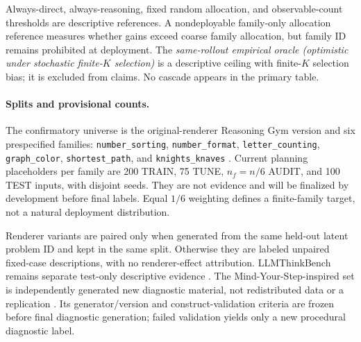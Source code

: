 \documentclass{article}
\newcommand{\1}{\mathbb{I}}
\begin{document}
Always-direct, always-reasoning, fixed random allocation, and observable-count thresholds are descriptive references. A nondeployable family-only allocation reference measures whether gains exceed coarse family allocation, but family ID remains prohibited at deployment. The \emph{same-rollout empirical oracle (optimistic under stochastic finite-$K$ selection)} is a descriptive ceiling with finite-$K$ selection bias; it is excluded from claims. No cascade appears in the primary table.

\paragraph{Splits and provisional counts.}
The confirmatory universe is the original-renderer Reasoning Gym version and six prespecified families: \texttt{number\_sorting}, \texttt{number\_format}, \texttt{letter\_counting}, \texttt{graph\_color}, \texttt{shortest\_path}, and \texttt{knights\_knaves} \citep{stojanovski2025reasoninggym,reasoninggymsoftware2026}. Current planning placeholders per family are 200 TRAIN, 75 TUNE, $n_f=n/6$ AUDIT, and 100 TEST inputs, with disjoint seeds. They are not evidence and will be finalized by development before final labels. Equal $1/6$ weighting defines a finite-family target, not a natural deployment distribution.

Renderer variants are paired only when generated from the same held-out latent problem ID and kept in the same split. Otherwise they are labeled unpaired fixed-case descriptions, with no renderer-effect attribution. LLMThinkBench remains separate test-only descriptive evidence \citep{srivastava-etal-2026-llms,llmthinkbenchsoftware2026}. The Mind-Your-Step-inspired set is independently generated new diagnostic material, not redistributed data or a replication \citep{pmlr-v267-liu25t,mindyourstepsoftware2025,taskcognitiondiagnosticplan2026}. Its generator/version and construct-validation criteria are frozen before final diagnostic generation; failed validation yields only a new procedural diagnostic label.
\end{document}
